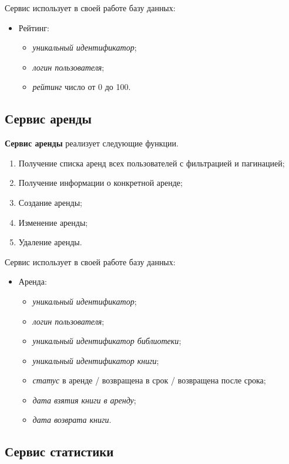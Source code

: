 Сервис использует в своей работе базу данных:
\begin{itemize}
  \item Рейтинг:
  \begin{itemize}
    \item \textit{уникальный идентификатор};
    \item \textit{логин пользователя};
    \item \textit{рейтинг} число от 0 до 100.
  \end{itemize}
\end{itemize}


\subsection{Сервис аренды} \label{section:reservation}

\textbf{Сервис аренды} реализует следующие функции.
\begin{enumerate}
	\item Получение списка аренд всех пользователей с фильтрацией и пагинацией;
	\item Получение информации о конкретной аренде;
	\item Создание аренды;
	\item Изменение аренды;
	\item Удаление аренды.
\end{enumerate}

Сервис использует в своей работе базу данных:
\begin{itemize}
  \item Аренда:
  \begin{itemize}
    \item \textit{уникальный идентификатор};
    \item \textit{логин пользователя};
    \item \textit{уникальный идентификатор библиотеки};
    \item \textit{уникальный идентификатор книги};
    \item \textit{статус} в аренде / возвращена в срок / возвращена после срока;
    \item \textit{дата взятия книги в аренду};
    \item \textit{дата возврата книги}.
  \end{itemize}
\end{itemize}


\subsection{Сервис статистики}

